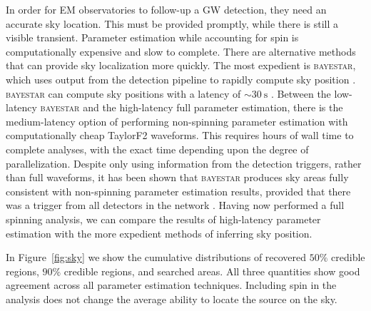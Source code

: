 In order for EM observatories to follow-up a GW detection, they need an accurate sky location. This must be provided promptly, while there is still a visible transient. Parameter estimation while accounting for spin is computationally expensive and slow to complete. There are alternative methods that can provide sky localization more quickly. The most expedient is \textsc{bayestar}, which uses output from the detection pipeline to rapidly compute sky position \citep{Singer_2014}. \textsc{bayestar} can compute sky positions with a latency of $\sim30~\mathrm{s}$ \citep{Berry_2014}. Between the low-latency \textsc{bayestar} and the high-latency full parameter estimation, there is the medium-latency option of performing non-spinning parameter estimation with computationally cheap TaylorF2 waveforms. This requires hours of wall time to complete analyses, with the exact time depending upon the degree of parallelization. Despite only using information from the detection triggers, rather than full waveforms, it has been shown that \textsc{bayestar} produces sky areas fully consistent with non-spinning parameter estimation results, provided that there was a trigger from all detectors in the network \citep{Singer_2014,Berry_2014}. Having now performed a full spinning analysis, we can compare the results of high-latency parameter estimation with the more expedient methods of inferring sky position.

In Figure~\ref{fig:sky} we show the cumulative distributions of recovered $50\%$ credible regions, $90\%$ credible regions, and searched areas. All three quantities show good agreement across all parameter estimation techniques. %
Including spin in the analysis does not change the average ability to locate the source on the sky.

  
  
  
  
  
  